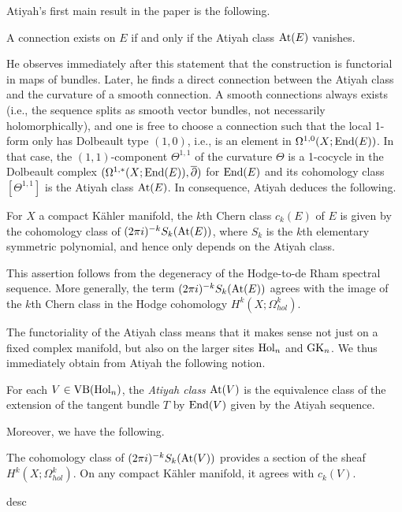 \documentclass[10pt]{amsart}
\begin{document}
Atiyah's first main result in the paper is the following.

\begin{prop}
A connection exists on $E$ if and only if the Atiyah class ${\rm At}(E)$ vanishes.
\end{prop}

He observes immediately after this statement that the construction is
functorial in maps of bundles. Later, he finds a direct connection
between the Atiyah class and the curvature of a smooth connection. A
smooth connections always exists (i.e., the sequence splits as smooth
vector bundles, not necessarily holomorphically), and one is free to
choose a connection such that the local 1-form only has
Dolbeault type $(1,0)$, i.e., is an element in $\Omega^{1,0}(X; {\rm End}(E))$. In that case, the $(1,1)$-component
$\Theta^{1,1}$ of the curvature $\Theta$ is a 1-cocycle in the
Dolbeault complex $(\Omega^{1,*}(X ; {\rm End}(E)), \overline{\partial})$ for ${\rm End}(E)$ and its cohomology class $[\Theta^{1,1}]$ is the Atiyah class ${\rm At}(E)$. In consequence, Atiyah deduces the following.

\begin{prop}
For $X$ a compact K\"ahler manifold, the $k$th Chern class $c_k(E)$ of $E$ is given by the cohomology class of $(2\pi i)^{-k} S_k({\rm At}(E))$, 
where $S_k$ is the $k$th elementary symmetric polynomial, and hence only depends on the Atiyah class.
\end{prop}

This assertion follows from the degeneracy of the Hodge-to-de Rham
spectral sequence. More generally, the term $(2\pi i)^{-k}
S_k({\rm At}(E))$ agrees with the image of the $k$th Chern class in the
Hodge cohomology $H^k(X ; \Omega^k_{hol})$.

The functoriality of the Atiyah class means that it makes sense not just on a fixed complex manifold, but also on the larger sites ${\rm Hol}_n$ and ${\rm GK}_n$. 
We thus immediately obtain from Atiyah the following notion.

\begin{dfn}
For each $V \in {\rm VB}({\rm Hol}_n)$, the {\em Atiyah class} ${\rm At}(V)$ is the equivalence class of the extension of the tangent bundle $T$ by ${\rm End}(V)$ given by the Atiyah sequence.
\end{dfn}

Moreover, we have the following.

\begin{lem}
The cohomology class of $(2\pi i)^{-k} S_k({\rm At}(V))$ provides a section
of the sheaf $H^k(X ; \Omega^k_{hol})$. On any compact K\"ahler manifold, it agrees with $c_k(V)$.
\end{lem}
desc
\end{document}
